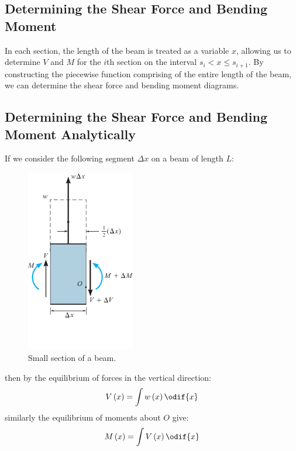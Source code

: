 \documentclass{article}
\begin{document}
\subsection{Determining the Shear Force and Bending Moment}
In each section, the length of the beam is treated as a variable \(x\),
allowing us to determine \(V\) and \(M\) for the \(i\)th section 
on the interval \(s_i < x \leq s_{i + 1}\).
By constructing the piecewise function comprising of the entire length of the beam, we can 
determine the shear force and bending moment diagrams.
\subsection{Determining the Shear Force and Bending Moment Analytically}
If we consider the following segment \(\Delta{x}\) on a beam of length \(L\):
\begin{figure}[H]
    \centering
    \includegraphics[height = 8cm, keepaspectratio = true]{figures/sfd_bmd_analytic.pdf}
    \caption{Small section of a beam.} %
\end{figure}
then by the equilibrium of forces in the vertical direction:
\begin{equation*}
    V\left( x \right) = \int w\left( x \right) \odif{x}
\end{equation*}
similarly the equilibrium of moments about \(O\) give:
\begin{equation*}
    M\left( x \right) = \int V\left( x \right) \odif{x}
\end{equation*}
\end{document}
